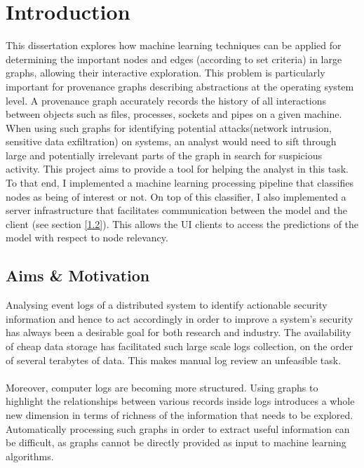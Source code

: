 
	
	\chapter{Introduction}
	
	This dissertation explores how machine learning techniques can be applied for determining the important nodes and edges (according to set criteria) in large graphs, allowing their interactive exploration. This problem is particularly important for provenance graphs describing abstractions at the operating system level. A provenance graph accurately records the history of all interactions between objects such as files, processes, sockets and pipes on a given machine. When using such graphs for identifying potential attacks(network intrusion, sensitive data exfiltration) on systems, an analyst would need to sift through large and potentially irrelevant parts of the graph in search for suspicious activity. This project aims to provide a tool for helping the analyst in this task. To that end, I implemented a machine learning processing pipeline that classifies nodes as being of interest or not. On top of this classifier, I also implemented a server infrastructure that facilitates communication between the model and the client (see section \ref{1.2}). This allows the UI clients to access the predictions of the model with respect to node relevancy. 
	
	\section{Aims \& Motivation}  \label{1.1}
	Analysing event logs of a distributed system to identify actionable security information and hence to act accordingly in order to improve a system's security has always been a desirable goal for both research and industry. The availability of cheap data storage has facilitated such large scale logs collection, on the order of several terabytes of data. This makes manual log review an unfeasible task. 
	\\ \\
	Moreover, computer logs are becoming more structured. Using graphs to highlight the relationships between various records inside logs introduces a whole new dimension in terms of richness of the information that needs to be explored. Automatically processing such graphs in order to extract useful information can be difficult, as graphs cannot be directly provided as input to machine learning algorithms.
	

